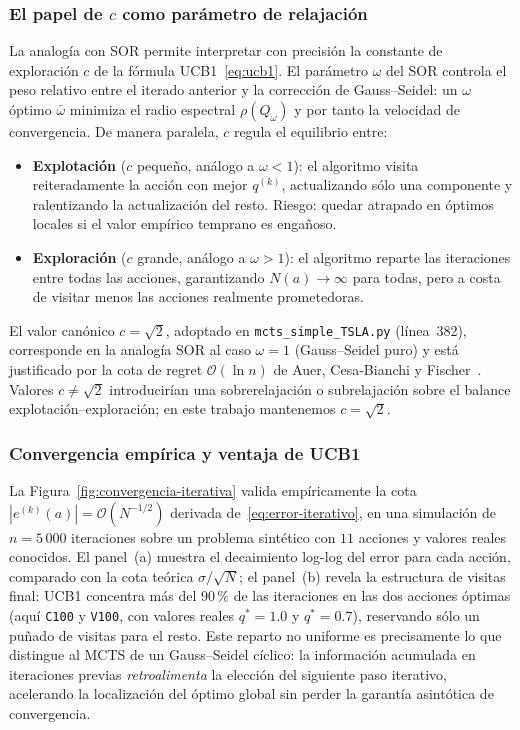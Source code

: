 \subsubsection*{El papel de $c$ como parámetro de relajación}

La analogía con SOR permite interpretar con precisión la constante de exploración $c$ de la fórmula UCB1~\eqref{eq:ucb1}. El parámetro $\omega$ del SOR controla el peso relativo entre el iterado anterior y la corrección de Gauss--Seidel: un $\omega$ óptimo $\bar\omega$ minimiza el radio espectral $\rho(Q_\omega)$ y por tanto la velocidad de convergencia. De manera paralela, $c$ regula el equilibrio entre:
\begin{itemize}
    \item \textbf{Explotación} ($c$ pequeño, análogo a $\omega < 1$): el algoritmo visita reiteradamente la acción con mejor $q^{(k)}$, actualizando sólo una componente y ralentizando la actualización del resto. Riesgo: quedar atrapado en óptimos locales si el valor empírico temprano es engañoso.
    \item \textbf{Exploración} ($c$ grande, análogo a $\omega > 1$): el algoritmo reparte las iteraciones entre todas las acciones, garantizando $N(a) \to \infty$ para todas, pero a costa de visitar menos las acciones realmente prometedoras.
\end{itemize}

El valor canónico $c = \sqrt{2}$, adoptado en \texttt{mcts\_simple\_TSLA.py} (línea~382), corresponde en la analogía SOR al caso $\omega = 1$ (Gauss--Seidel puro) y está justificado por la cota de regret $\mathcal{O}(\ln n)$ de Auer, Cesa-Bianchi y Fischer~\cite{auer2002}. Valores $c \neq \sqrt{2}$ introducirían una sobrerelajación o subrelajación sobre el balance explotación--exploración; en este trabajo mantenemos $c = \sqrt{2}$.

\subsubsection*{Convergencia empírica y ventaja de UCB1}

La Figura~\ref{fig:convergencia-iterativa} valida empíricamente la cota $|e^{(k)}(a)| = \mathcal{O}(N^{-1/2})$ derivada de~\eqref{eq:error-iterativo}, en una simulación de $n=5\,000$ iteraciones sobre un problema sintético con $11$ acciones y valores reales conocidos. El panel~(a) muestra el decaimiento log-log del error para cada acción, comparado con la cota teórica $\sigma/\sqrt{N}$; el panel~(b) revela la estructura de visitas final: UCB1 concentra más del $90\,\%$ de las iteraciones en las dos acciones óptimas (aquí \texttt{C100} y \texttt{V100}, con valores reales $q^*=1{.}0$ y $q^*=0{.}7$), reservando sólo un puñado de visitas para el resto. Este reparto no uniforme es precisamente lo que distingue al MCTS de un Gauss--Seidel cíclico: la información acumulada en iteraciones previas \emph{retroalimenta} la elección del siguiente paso iterativo, acelerando la localización del óptimo global sin perder la garantía asintótica de convergencia.

